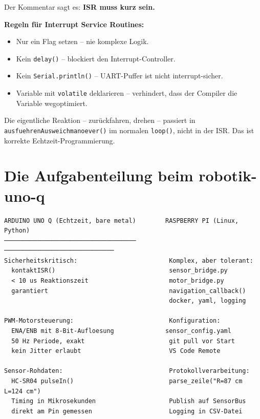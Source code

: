 Der Kommentar sagt es: \textbf{ISR muss kurz sein.}

\begin{wissenBox}
\textbf{Regeln für Interrupt Service Routines:}
\begin{itemize}
  \item Nur ein Flag setzen -- nie komplexe Logik.
  \item Kein \texttt{delay()} -- blockiert den Interrupt-Controller.
  \item Kein \texttt{Serial.println()} -- UART-Puffer ist nicht
        interrupt-sicher.
  \item Variable mit \texttt{volatile} deklarieren -- verhindert,
        dass der Compiler die Variable wegoptimiert.
\end{itemize}

Die eigentliche Reaktion -- zurückfahren, drehen -- passiert in
\texttt{ausfuehrenAusweichmanoever()} im normalen
\texttt{loop()}, nicht in der ISR.
Das ist korrekte Echtzeit-Programmierung.
\end{wissenBox}

\section{Die Aufgabenteilung beim robotik-uno-q}

\begin{lstlisting}[style=text]
ARDUINO UNO Q (Echtzeit, bare metal)        RASPBERRY PI (Linux, Python)
────────────────────────────────────         ──────────────────────────────
Sicherheitskritisch:                         Komplex, aber tolerant:
  kontaktISR()                               sensor_bridge.py
  < 10 us Reaktionszeit                      motor_bridge.py
  garantiert                                 navigation_callback()
                                             docker, yaml, logging

PWM-Motorsteuerung:                          Konfiguration:
  ENA/ENB mit 8-Bit-Aufloesung              sensor_config.yaml
  50 Hz Periode, exakt                       git pull vor Start
  kein Jitter erlaubt                        VS Code Remote

Sensor-Rohdaten:                             Protokollverarbeitung:
  HC-SR04 pulseIn()                          parse_zeile("R=87 cm  L=124 cm")
  Timing in Mikrosekunden                    Publish auf SensorBus
  direkt am Pin gemessen                     Logging in CSV-Datei
\end{lstlisting}


